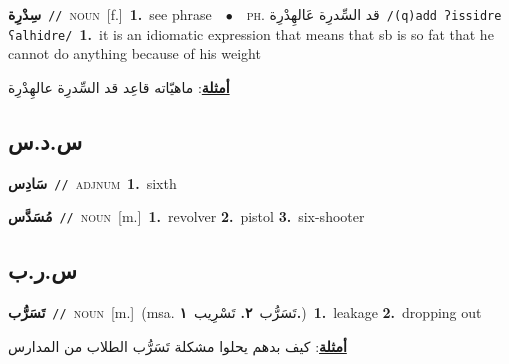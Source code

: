 \documentclass[10pt,a4paper,twoside]{article} %
\begin{document}
\begin{multicols}{2}
{\setlength\topsep{0pt}\textbf{\foreignlanguage{arabic}{سِدْرِة}}\ {\color{gray}\texttt{//}\color{black}}\ \textsc{noun}\ [f.]\ \textbf{1.}~see phrase\ \ $\bullet$\ \ \textsc{ph.} \color{gray} \foreignlanguage{arabic}{قد السِّدرِة عَالهِدْرِة}\color{black}\ {\color{gray}\texttt{/{\sffamily (q)add ʔissidre ʕalhidre}/}\color{black}}\ \textbf{1.}~it is an idiomatic expression that means that sb is so fat that he cannot do anything because of his weight\  \begin{flushright}\color{gray}\foreignlanguage{arabic}{\textbf{\underline{\foreignlanguage{arabic}{أمثلة}}}: ماهيّاته قاعِد قد السِّدرِة عالهِدْرِة}\end{flushright}\color{black}} \vspace{2mm}

\vspace{-3mm}
\subsection*{\color{blue}\foreignlanguage{arabic}{س.د.س}\color{blue}{}} 

{\setlength\topsep{0pt}\textbf{\foreignlanguage{arabic}{سَادِس}}\ {\color{gray}\texttt{//}\color{black}}\ \textsc{adj\textunderscore num}\ \textbf{1.}~sixth\ } \vspace{2mm}

{\setlength\topsep{0pt}\textbf{\foreignlanguage{arabic}{مُسَدَّس}}\ {\color{gray}\texttt{//}\color{black}}\ \textsc{noun}\ [m.]\ \textbf{1.}~revolver  \textbf{2.}~pistol  \textbf{3.}~six-shooter\ } \vspace{2mm}

\vspace{-3mm}
\subsection*{\color{blue}\foreignlanguage{arabic}{س.ر.ب}\color{blue}{}} 

{\setlength\topsep{0pt}\textbf{\foreignlanguage{arabic}{تَسَرُّب}}\ {\color{gray}\texttt{//}\color{black}}\ \textsc{noun}\ [m.]\ \color{gray}(msa. \foreignlanguage{arabic}{تَسَرُّب}~\foreignlanguage{arabic}{\textbf{٢.}}  \foreignlanguage{arabic}{تَسْرِيب}~\foreignlanguage{arabic}{\textbf{١.}})\color{black}\ \textbf{1.}~leakage  \textbf{2.}~dropping out\  \begin{flushright}\color{gray}\foreignlanguage{arabic}{\textbf{\underline{\foreignlanguage{arabic}{أمثلة}}}: كيف بدهم يحلوا مشكلة تَسَرُّب الطلاب من المدارس}\end{flushright}\color{black}} \vspace{2mm}


\end{multicols}
\end{document}
